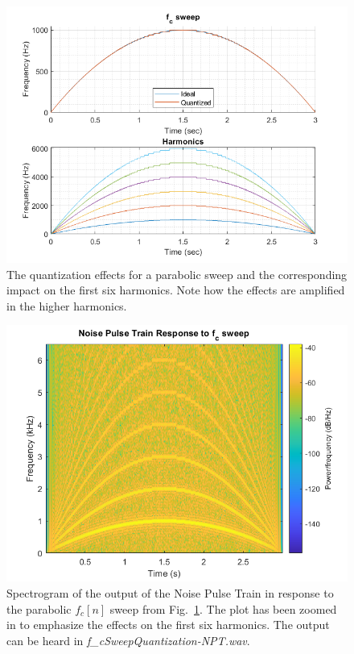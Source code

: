 \documentclass[../main.tex]{subfiles}
\begin{document}
\begin{figure}[h!]
    \centering
    \includegraphics[scale=.57]{./images/plots/f_cSweepQuantized.png}
    \caption{The quantization effects for a parabolic sweep and the corresponding impact on the first six harmonics. Note how the effects are amplified in the higher harmonics.}
    \label{fig:f_cSweepQuantized}
\end{figure}

\begin{figure}[h!]
    \centering
    \includegraphics[scale=.57]{./images/plots/f_cSweepNPT.png}
    \caption{Spectrogram of the output of the Noise Pulse Train in response to the parabolic $f_c[n]$ sweep from Fig.~\ref{fig:f_cSweepQuantized}. The plot has been zoomed in to emphasize the effects on the first six harmonics. The output can be heard in \emph{f\_cSweepQuantization-NPT.wav}.}
    \label{fig:f_cQuantizedSpectrum}
\end{figure}
\end{document}
